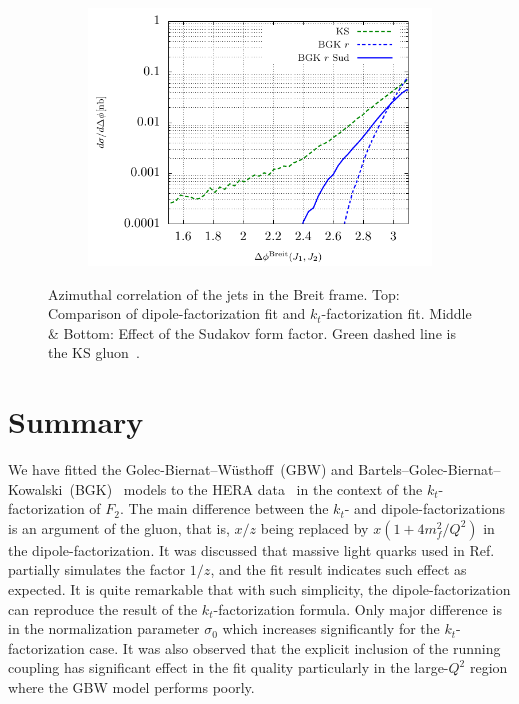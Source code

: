\documentclass[11pt]{article}
\numberwithin{equation}{section}
\numberwithin{table}{section}
\numberwithin{figure}{section}
\begin{document}
\begin{figure}[p]
\begin{subfigure}{0.48\textwidth}
		\includegraphics[width=\textwidth]{plots/plotBGK3Jets}
	\end{subfigure}
\caption{\footnotesize Azimuthal correlation of the jets in the Breit frame. Top: Comparison of dipole-factorization fit and $k_t$-factorization fit. Middle \& Bottom: Effect of the Sudakov form factor. Green dashed line is the KS gluon~\cite{vanHameren:2021sqc}. }
\label{fig:jj-breit}
\end{figure}

\section{Summary}
We have fitted the Golec-Biernat--W\"usthoff~(GBW)\cite{Golec-Biernat:1998zce} and Bartels--Golec-Biernat--Kowalski~(BGK)~\cite{Bartels:2002cj} models to the HERA data~\cite{Abt:2017nkc} in the context of the $k_t$-factorization of $F_2$.  The main difference between the $k_t$- and dipole-factorizations is an argument of the gluon, that is, $x/z$ being replaced by $x(1+4m_f^2/Q^2)$ in the dipole-factorization. It was discussed that massive light quarks used in Ref.~\cite{Golec-Biernat:1998zce} partially simulates the factor $1/z$, and the fit result indicates such effect as expected. It is quite remarkable that with such simplicity, the dipole-factorization can reproduce the result of the $k_t$-factorization formula. Only major difference is in the normalization parameter $\sigma_0$ which increases significantly for the $k_t$-factorization case. It was also observed that the explicit inclusion of the running coupling has significant effect in the fit quality particularly in the large-$Q^2$ region where the GBW model performs poorly.       
\end{document}
